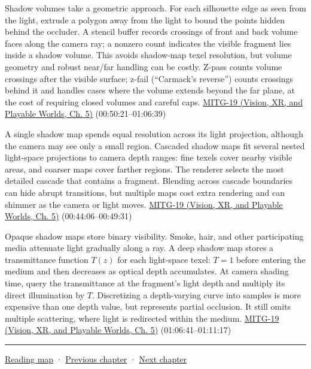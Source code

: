 Shadow volumes take a geometric approach. For each silhouette edge as seen from the light, extrude a polygon away from the light to bound the points hidden behind the occluder. A stencil buffer records crossings of front and back volume faces along the camera ray; a nonzero count indicates the visible fragment lies inside a shadow volume. This avoids shadow-map texel resolution, but volume geometry and robust near/far handling can be costly. Z-pass counts volume crossings after the visible surface; z-fail (``Carmack's reverse'') counts crossings behind it and handles cases where the volume extends beyond the far plane, at the cost of requiring closed volumes and careful caps. \href{../07-Vision-XR-and-Playable-Worlds/main.pdf\#nameddest=04-visual-computing-ii-ch036-mitg-19---shadow-maps}{MITG-19 (Vision, XR, and Playable Worlds, Ch. 5)} (00:50:21--01:06:39)

A single shadow map spends equal resolution across its light projection, although the camera may see only a small region. Cascaded shadow maps fit several nested light-space projections to camera depth ranges: fine texels cover nearby visible areas, and coarser maps cover farther regions. The renderer selects the most detailed cascade that contains a fragment. Blending across cascade boundaries can hide abrupt transitions, but multiple maps cost extra rendering and can shimmer as the camera or light moves. \href{../07-Vision-XR-and-Playable-Worlds/main.pdf\#nameddest=04-visual-computing-ii-ch036-mitg-19---shadow-maps}{MITG-19 (Vision, XR, and Playable Worlds, Ch. 5)} (00:44:06--00:49:31)

Opaque shadow maps store binary visibility. Smoke, hair, and other participating media attenuate light gradually along a ray. A deep shadow map stores a transmittance function \(T(z)\) for each light-space texel: \(T=1\) before entering the medium and then decreases as optical depth accumulates. At camera shading time, query the transmittance at the fragment's light depth and multiply its direct illumination by \(T\). Discretizing a depth-varying curve into samples is more expensive than one depth value, but represents partial occlusion. It still omits multiple scattering, where light is redirected within the medium. \href{../07-Vision-XR-and-Playable-Worlds/main.pdf\#nameddest=04-visual-computing-ii-ch036-mitg-19---shadow-maps}{MITG-19 (Vision, XR, and Playable Worlds, Ch. 5)} (01:06:41--01:11:17)

\begin{center}\rule{0.5\linewidth}{0.5pt}\end{center}

\hyperref[volume-reading-map]{Reading map} · \hyperref[04-visual-computing-ii-ch027-mesh-queries-classification-and-clipping]{Previous chapter} · \hyperref[04-visual-computing-ii-ch029-acceleration-structures-and-robust-queries]{Next chapter}
